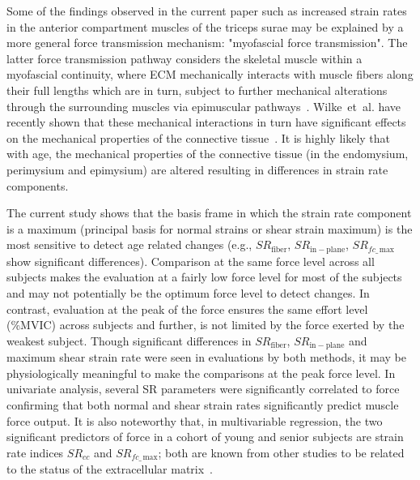 Some of the findings observed in the current paper such as increased strain rates in the anterior compartment muscles of the triceps surae may be explained by a more general force transmission mechanism: "myofascial force transmission".
The latter force transmission pathway considers the skeletal muscle within a myofascial continuity, where ECM mechanically interacts with muscle fibers along their full lengths which are in turn, subject to further mechanical alterations through the surrounding muscles via epimuscular pathways~\cite{RNSS18}. 
Wilke~et~al. have recently shown that these mechanical interactions in turn have significant effects on the mechanical properties of the connective tissue~\cite{RNSS19}.  
It is highly likely that with age, the mechanical properties of the connective tissue (in the endomysium, perimysium and epimysium) are altered resulting in differences in strain rate components.

The current study shows that the basis frame in which the strain rate component is a maximum (principal basis for normal strains or shear strain maximum) is the most sensitive to detect age related changes (e.g., $SR_{\mathrm{fiber}}$, $SR_{\mathrm{in-plane}}$, $SR_{fc\_\,\mathrm{max}}$ show significant differences). 
Comparison at the same force level across all subjects makes the evaluation at a fairly low force level for most of the subjects and may not potentially be the optimum force level to detect changes. 
In contrast, evaluation at the peak of the force ensures the same effort level (\%MVIC) across subjects and further, is not limited by the force exerted by the weakest subject. 
Though significant differences in $SR_{\mathrm{fiber}}$, $SR_{\mathrm{in-plane}}$ and maximum shear strain rate were seen in evaluations by both methods, it may be physiologically meaningful to make the comparisons at the peak force level. 
In univariate analysis, several SR parameters were significantly correlated to force confirming that both normal and shear strain rates significantly predict muscle force output. 
It is also noteworthy that, in multivariable regression, the two significant predictors of force in a cohort of young and senior subjects are strain rate indices $SR_{cc}$ and $SR_{fc\_\,\mathrm{max}}$; both are known from other studies to be related to the status of the extracellular matrix~\cite{RNSS15, RNS15, RNSS17}.

